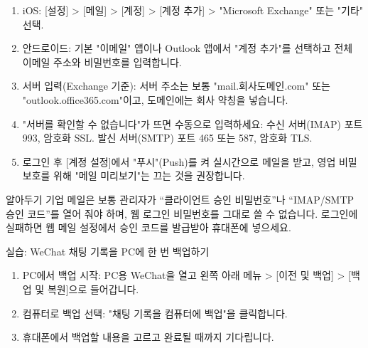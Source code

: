 
\begin{enumerate}
  \item iOS: [설정] > [메일] > [계정] > [계정 추가] > "Microsoft Exchange" 또는 "기타" 선택.
  \item 안드로이드: 기본 "이메일" 앱이나 Outlook 앱에서 "계정 추가"를 선택하고 전체 이메일 주소와 비밀번호를 입력합니다.
  \item 서버 입력(Exchange 기준): 서버 주소는 보통 "mail.회사도메인.com" 또는 "outlook.office365.com"이고, 도메인에는 회사 약칭을 넣습니다.
  \item "서버를 확인할 수 없습니다"가 뜨면 수동으로 입력하세요: 수신 서버(IMAP) 포트 993, 암호화 SSL. 발신 서버(SMTP) 포트 465 또는 587, 암호화 TLS.
  \item 로그인 후 [계정 설정]에서 "푸시"(Push)를 켜 실시간으로 메일을 받고, 영업 비밀 보호를 위해 "메일 미리보기"는 끄는 것을 권장합니다.
\end{enumerate}

\begin{tcbinfo}{알아두기}
기업 메일은 보통 관리자가 “클라이언트 승인 비밀번호”나 “IMAP/SMTP 승인 코드”를 열어 줘야 하며, 웹 로그인 비밀번호를 그대로 쓸 수 없습니다. 로그인에 실패하면 웹 메일 설정에서 승인 코드를 발급받아 휴대폰에 넣으세요.

\end{tcbinfo}

\begin{tcbpractice}{실습: WeChat 채팅 기록을 PC에 한 번 백업하기}
\begin{enumerate}
  \item PC에서 백업 시작: PC용 WeChat을 열고 왼쪽 아래 메뉴 > [이전 및 백업] > [백업 및 복원]으로 들어갑니다.
  \item 컴퓨터로 백업 선택: "채팅 기록을 컴퓨터에 백업"을 클릭합니다.
  \item 휴대폰에서 백업할 내용을 고르고 완료될 때까지 기다립니다.
\end{enumerate}

\end{tcbpractice}
